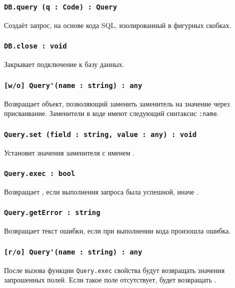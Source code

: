 \subsubsection{\lstinline|DB.query (q : Code) : Query|}

Создаёт запрос, на основе кода SQL, изолированный в фигурных скобках.

\subsubsection{\lstinline|DB.close : void|}

Закрывает подключение к базу данных.

\subsubsection{\lstinline|[w/o] Query'(name : string) : any|}

Возвращает объект, позволяющий заменить заменитель на значение через присваивание. Заменители в коде имеют следующий синтаксис \lstinline|:name|.

\subsubsection{\lstinline|Query.set (field : string, value : any) : void|}

Установит значения заменителя с именем .

\subsubsection{\lstinline|Query.exec : bool|}

Возвращает \true, если выполнения запроса была успешной, иначе \false.

\subsubsection{\lstinline|Query.getError : string|}

Возвращает текст ошибки, если при выполнении кода произошла ошибка.

\subsubsection{\lstinline|[r/o] Query'(name : string) : any|}

После вызова функции \lstinline|Query.exec| свойства будут возвращать значения запрошенных полей. Если такое поле отсутствует, будет возвращать \void.

